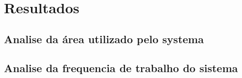 
\chapter{Resultados}
\label{chapter:results}


\section{Analise da área utilizado pelo systema}


\section{Analise da frequencia de trabalho do sistema}

\cleardoublepage

